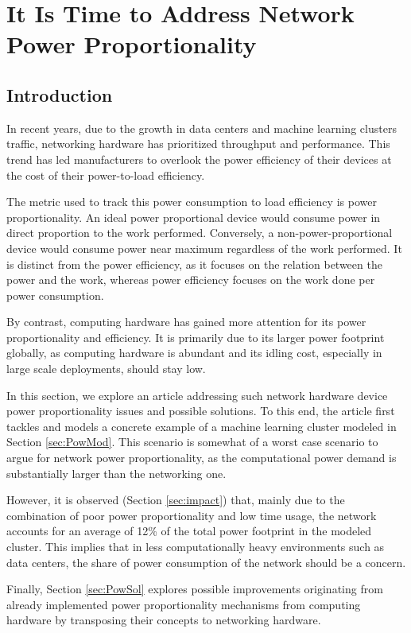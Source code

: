 \section{It Is Time to Address Network Power Proportionality} \label{sec:NetPowProp}
\subsection{Introduction}
In recent years, due to the growth in data centers and machine learning clusters traffic, networking hardware has prioritized throughput and performance.
This trend has led manufacturers to overlook the power efficiency of their devices at the cost of their power-to-load efficiency.

The metric used to track this power consumption to load efficiency is power proportionality. 
An ideal power proportional device would consume power in direct proportion to the work performed. 
Conversely, a non-power-proportional device would consume power near maximum regardless of the work performed. 
It is distinct from the power efficiency, as it focuses on the relation between the power and the work, whereas power efficiency focuses on the work done per power consumption.

By contrast, computing hardware has gained more attention for its power proportionality and efficiency. It is primarily due to its larger power footprint globally, as computing hardware is abundant and its idling cost, especially in large scale deployments, should stay low.

In this section, we explore an article \cite{NetPowProp} addressing such network hardware device power proportionality issues and possible solutions.
To this end, the article first tackles and models a concrete example of a machine learning cluster modeled in Section \ref{sec:PowMod}.
This scenario is somewhat of a worst case scenario to argue for network power proportionality, as the computational power demand is substantially larger than the networking one. 

However, it is observed  (Section \ref{sec:impact}) that, mainly due to the combination of poor power proportionality and low time usage, the network accounts for an average of 12\% of the total power footprint in the modeled cluster.
This implies that in less computationally heavy environments such as data centers, the share of power consumption of the network should be a concern.   

Finally, Section \ref{sec:PowSol} explores possible improvements originating from already implemented power proportionality mechanisms from computing hardware by transposing their concepts to networking hardware.

